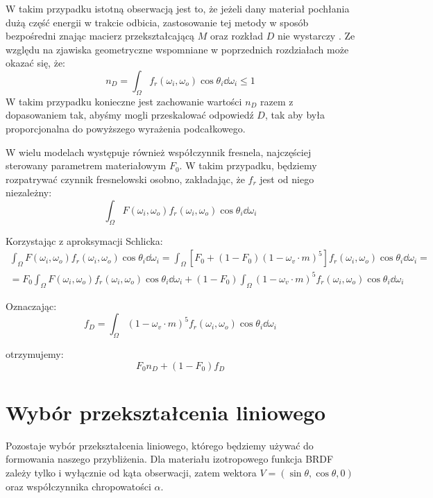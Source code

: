 \documentclass[../main.tex]{subfiles}
\begin{document}
W takim przypadku istotną obserwacją jest to, że jeżeli dany materiał pochłania dużą część energii w trakcie odbicia, zastosowanie tej metody w sposób bezpośredni znając macierz przekształcającą $M$ oraz rozkład $D$ nie wystarczy \cite{LTCFresnelApprox}. Ze względu na zjawiska geometryczne wspomniane w poprzednich rozdziałach może okazać się, że:
\[
    n_D = \int_{\Omega} {
        f_r(\omega_i, \omega_o) \cos\theta_i 
        \dd \omega_i
    } \leq 1
\]
W takim przypadku konieczne jest zachowanie wartości $n_D$ razem z dopasowaniem tak, abyśmy mogli przeskalować odpowiedź $D$, tak aby była proporcjonalna do powyższego wyrażenia podcałkowego.

W wielu modelach występuje również współczynnik fresnela, najczęściej sterowany parametrem materiałowym $F_0$. W takim przypadku, będziemy rozpatrywać czynnik fresnelowski osobno, zakładając, że $f_r$ jest od niego niezależny:
\[
\int_{\Omega} {
    F(\omega_i, \omega_o)
    f_r(\omega_i, \omega_o) 
    \cos\theta_i 
    \dd \omega_i
}
\]

Korzystając z aproksymacji Schlicka: 
\begin{gather*}
\int_{\Omega} {
    F(\omega_i, \omega_o)
    f_r(\omega_i, \omega_o) 
    \cos\theta_i 
    \dd \omega_i
} =
\int_{\Omega} {
    \left[
        F_0 + (1-F_0)(1 - \omega_v \cdot m)^5
    \right]
    f_r(\omega_i, \omega_o) 
    \cos\theta_i 
    \dd \omega_i
} = \\
= F_0 \int_{\Omega} {
    F(\omega_i, \omega_o)
    f_r(\omega_i, \omega_o) 
    \cos\theta_i 
    \dd \omega_i
} + (1-F_0) \int_{\Omega} {
    (1 - \omega_v \cdot m)^5
    f_r(\omega_i, \omega_o) 
    \cos\theta_i 
    \dd \omega_i
}
\end{gather*}

Oznaczając:
\[
    f_D = \int_{\Omega} {
        (1 - \omega_v \cdot m)^5
        f_r(\omega_i, \omega_o) 
        \cos\theta_i 
        \dd \omega_i
    }
\]

\noindent otrzymujemy:
\[
    F_0 n_D + (1-F_0) f_D
\]


\section{Wybór przekształcenia liniowego}

Pozostaje wybór przekształcenia liniowego, którego będziemy używać do
formowania naszego przybliżenia. Dla materiału izotropowego funkcja BRDF
zależy tylko i wyłącznie od kąta obserwacji, zatem wektora
$V = (\sin\theta, \cos\theta, 0)$
oraz współczynnika chropowatości $\alpha$.
\end{document}
